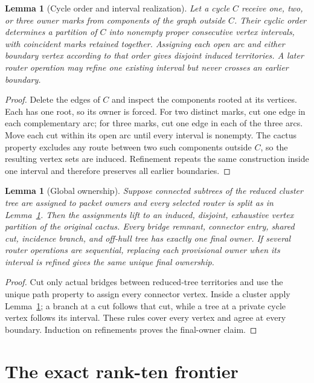\documentclass[11pt]{article}
\newtheorem{lemma}[theorem]{Lemma}
\begin{document}
\begin{lemma}[Cycle order and interval realization]\label{lem:cycleorder}
Let a cycle $C$ receive one, two, or three owner marks from components of the
graph outside $C$.  Their cyclic order determines a partition of $C$ into
nonempty proper consecutive vertex intervals, with coincident marks retained
together.  Assigning each open arc and either boundary vertex according to
that order gives disjoint induced territories.  A later router operation may
refine one existing interval but never crosses an earlier boundary.
\end{lemma}

\begin{proof}
Delete the edges of $C$ and inspect the components rooted at its vertices.
Each has one root, so its owner is forced.  For two distinct marks, cut one
edge in each complementary arc; for three marks, cut one edge in each of the
three arcs.  Move each cut within its open arc until every interval is
nonempty.  The cactus property excludes any route between two such components
outside $C$, so the resulting vertex sets are induced.  Refinement repeats
the same construction inside one interval and therefore preserves all earlier
boundaries.
\end{proof}

\begin{lemma}[Global ownership]\label{lem:ownership}
Suppose connected subtrees of the reduced cluster tree are assigned to packet
owners and every selected router is split as in Lemma~\ref{lem:cycleorder}.
Then the assignments lift to an induced, disjoint, exhaustive vertex
partition of the original cactus.  Every bridge remnant, connector entry,
shared cut, incidence branch, and off-hull tree has exactly one final owner.
If several router operations are sequential, replacing each provisional owner
when its interval is refined gives the same unique final ownership.
\end{lemma}

\begin{proof}
Cut only actual bridges between reduced-tree territories and use the unique
path property to assign every connector vertex.  Inside a cluster apply
Lemma~\ref{lem:cycleorder}; a branch at a cut follows that cut, while a tree at
a private cycle vertex follows its interval.  These rules cover every vertex
and agree at every boundary.  Induction on refinements proves the final-owner
claim.
\end{proof}

\section{The exact rank-ten frontier}
\end{document}
